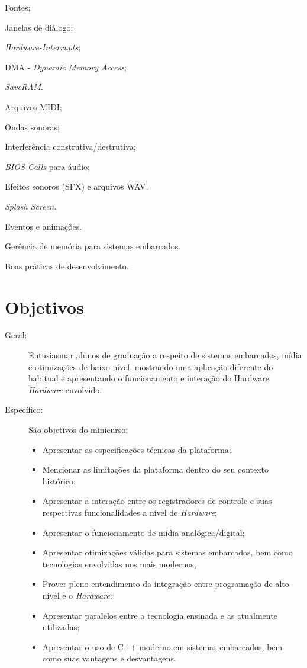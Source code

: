 \documentclass{article}
\begin{document}
\begin{itemize*}[label={}]
    \item[] Fontes;
    \item[] Janelas de diálogo;
    \item[] \textit{Hardware-Interrupts};
    \item[] DMA - \textit{Dynamic Memory Access};
    \item[] \textit{SaveRAM}.
    \item[] Arquivos MIDI;
    \item[] Ondas sonoras;
    \item[] Interferência construtiva/destrutiva;
    \item[] \textit{BIOS-Calls} para áudio;
    \item[] Efeitos sonoros (SFX) e arquivos WAV.
    \item[] \textit{Splash Screen}.
    \item[] Eventos e animações.
    \item[] Gerência de memória para sistemas embarcados.
    \item[] Boas práticas de desenvolvimento.
\end{itemize*}

\section{Objetivos}

\begin{description}
    \item[Geral:] Entusiasmar alunos de graduação a respeito de sistemas embarcados, mídia e otimizações de baixo nível, mostrando uma aplicação diferente do habitual e apresentando o funcionamento e interação do Hardware \textit{Hardware} envolvido.
    \item[Específico:] São objetivos do minicurso:
        \begin{itemize}[label={-}]
                \item[] Apresentar as especificações técnicas da plataforma;
                \item[] Mencionar as limitações da plataforma dentro do seu  contexto histórico;
                \item[] Apresentar a interação entre os registradores de controle e suas respectivas funcionalidades a nível de \textit{Hardware};
                \item[] Apresentar o funcionamento de mídia analógica/digital;
                \item[] Apresentar otimizações válidas para sistemas embarcados, bem como tecnologias envolvidas nos mais modernos;
                \item[] Prover pleno entendimento da integração entre programação de alto-nível e o \textit{Hardware};
                \item[] Apresentar paralelos entre a tecnologia ensinada e as atualmente utilizadas;
                \item[] Apresentar o uso de C++ moderno em sistemas embarcados, bem como suas vantagens e desvantagens.
        \end{itemize}
\end{description}
\end{document}
